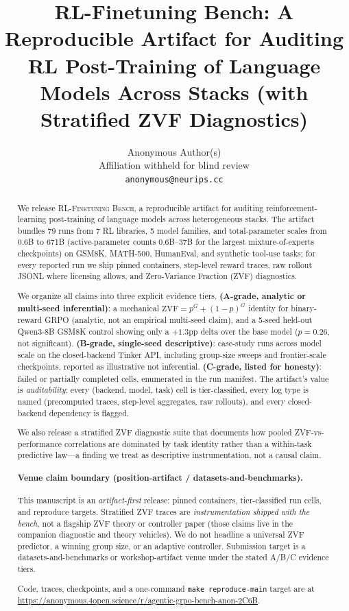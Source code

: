 \documentclass{article}
\title{RL-Finetuning Bench: A Reproducible Artifact for Auditing RL Post-Training of Language Models Across Stacks (with Stratified ZVF Diagnostics)}
\author{Anonymous Author(s)\\
  Affiliation withheld for blind review\\
  \texttt{anonymous@neurips.cc}}
\newcommand{\ours}{\textsc{RL-Finetuning Bench}}
\begin{document}
\sloppy
{}
\hfuzz=2pt

\maketitle

\begin{abstract}
We release \ours{}, a reproducible artifact for auditing reinforcement-learning
post-training of language models across heterogeneous stacks. The artifact
bundles 79 runs from 7 RL libraries, 5 model families, and total-parameter
scales from 0.6B to 671B (active-parameter counts 0.6B--37B for the largest
mixture-of-experts checkpoints) on GSM8K, MATH-500, HumanEval, and synthetic
tool-use tasks; for every reported run we ship pinned containers, step-level
reward traces, raw rollout JSONL where licensing allows, and Zero-Variance
Fraction (ZVF) diagnostics.

We organize all claims into three explicit evidence tiers.
\textbf{(A-grade, analytic or multi-seed inferential)}: a mechanical
$\mathrm{ZVF}=p^{G}+(1{-}p)^{G}$ identity for binary-reward GRPO (analytic,
not an empirical multi-seed claim), and a 5-seed
held-out Qwen3-8B GSM8K control showing only a $+1.3$pp delta over the base
model ($p{=}0.26$, not significant). \textbf{(B-grade, single-seed descriptive)}:
case-study runs across model scale on the closed-backend Tinker API, including
group-size sweeps and frontier-scale checkpoints, reported as illustrative not
inferential. \textbf{(C-grade, listed for honesty)}: failed or partially
completed cells, enumerated in the run manifest. The artifact's value is
\emph{auditability}: every (backend, model, task) cell is tier-classified, every
log type is named (precomputed traces, step-level aggregates, raw rollouts), and
every closed-backend dependency is flagged.

We also release a stratified ZVF diagnostic suite that documents how pooled
ZVF-vs-performance correlations are dominated by task identity rather than a
within-task predictive law---a finding we treat as descriptive
instrumentation, not a causal claim.

\paragraph{Venue claim boundary (position-artifact / datasets-and-benchmarks).}
This manuscript is an \emph{artifact-first} release: pinned containers,
tier-classified run cells, and reproduce targets. Stratified ZVF traces are
\emph{instrumentation shipped with the bench}, not a flagship ZVF theory or
controller paper (those claims live in the companion diagnostic and theory
vehicles). We do not headline a universal ZVF predictor, a winning group size,
or an adaptive controller. Submission target is a datasets-and-benchmarks or
workshop-artifact venue under the stated A/B/C evidence tiers.

Code, traces, checkpoints, and a one-command \texttt{make reproduce-main}
target are at
\url{https://anonymous.4open.science/r/agentic-grpo-bench-anon-2C6B}.
\end{abstract}
 
\end{document}
